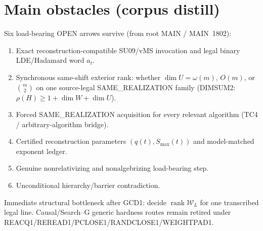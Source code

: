 \documentclass[11pt]{article}
\begin{document}
\section*{Main obstacles (corpus distill)}
Six load-bearing OPEN arrows survive (from root MAIN / MAIN~1802):
\begin{enumerate}
\item Exact reconstruction-compatible SU09/vMS invocation and legal binary LDE/Hadamard word $a_t$.
\item Synchronous same-shift exterior rank: whether $\dim U=\omega(m)$, $O(m)$, or $\binom{m}{2}$
on one source-legal SAME\_REALIZATION family (DIMSUM2: $\rho(H)\ge 1+\dim W+\dim U$).
\item Forced SAME\_REALIZATION acquisition for every relevant algorithm (TC4 / arbitrary-algorithm bridge).
\item Certified reconstruction parameters $(q(t),S_{\max}(t))$ and model-matched exponent ledger.
\item Genuine nonrelativizing and nonalgebrizing load-bearing step.
\item Unconditional hierarchy/barrier contradiction.
\end{enumerate}
Immediate structural bottleneck after GCD1: decide $\operatorname{rank}\mathcal W_L$ for one transcribed legal line.
Causal/Search--G generic hardness routes remain retired under REACQ1/REREAD1/PCLOSE1/RANDCLOSE1/WEIGHTPAD1.
\end{document}
